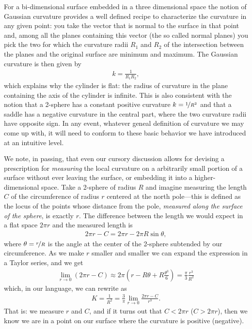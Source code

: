 For a bi-dimensional surface embedded in a three dimensional space the notion of
Gaussian curvature provides a well defined recipe to characterize the curvature
in any given point: you take the vector that is normal to the surface in that
point and, among all the planes containing this vector (the so called normal planes)
you pick the two for which the curvature radii $R_1$ and $R_2$ of the intersection
between the planes and the original surface are minimum and maximum. The Gaussian
curvature is then given by
\begin{align}\label{eq:gaussian_curvature}
  k = \frac{1}{R_1 R_2},
\end{align}
which explains why the cylinder is flat: the radius of curvature in the plane containing
the axis of the cylinder is infinite. This is also consistent with the notion that
a 2-sphere has a constant positive curvature $k = \nicefrac{1}{R^2}$ and that a
saddle has a negative curvature in the central part, where the two curvature radii
have opposite sign. In any event, whatever geneal definition of curvature we may
come up with, it will need to conform to these basic behavior we have introduced
at an intuitive level.

We note, in passing, that even our cursory discussion allows for devising a prescription
for \emph{measuring} the local curvature on a arbitrarily small portion of a surface
without ever leaving the surface, or embedding it into a higher-dimensional space.
Take a 2-sphere of radius $R$ and imagine measuring the length $C$ of the circumference
of radius $r$ centered at the north pole---this is defined as the locus of the points
whose distance from the pole, \emph{measured along the surface of the sphere}, is
exactly $r$. The difference between the length we would expect
in a flat space $2\pi r$ and the measured length is
\begin{align*}
  2\pi r - C = 2\pi r - 2\pi R \sin\theta,
\end{align*}
where $\theta = \nicefrac{r}{R}$ is the angle at the center of the 2-sphere subtended
by our circumference. As we make $r$ smaller and smaller we can expand the expression
in a Taylor series, and we get
\begin{align*}
  \lim_{r\rightarrow 0} (2\pi r - C) \approx
  2\pi \left( r - R\theta + R \frac{\theta^3}{6} \right) =
  \frac{\pi}{3} \frac{r^3}{R^2}
\end{align*}
which, in our language, we can rewrite as
\begin{align}
  K = \frac{1}{R^2} = \frac{3}{\pi} \lim_{r\rightarrow 0} \frac{2\pi r - C}{r^3}.
\end{align}
That is: we measure $r$ and $C$, and if it turns out that $C < 2\pi r$ ($C > 2\pi r$),
then we know we are in a point on our surface where the curvature is positive (negative).



